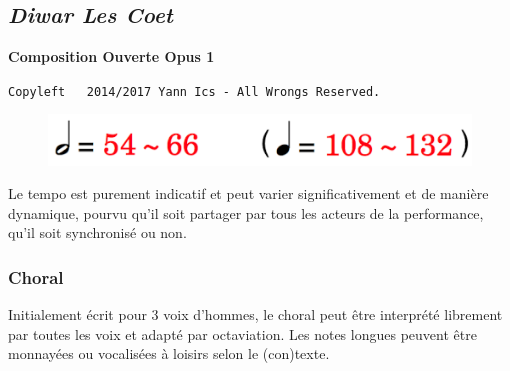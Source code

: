 
\chapter*{}

\section*{\textsl{Diwar Les Coet}}

\label{dlcscore}

\begin{center} 
\textbf{Composition Ouverte Opus 1}

{\scriptsize  \texttt{Copyleft \textcopyleft \, 2014/2017 Yann Ics - All Wrongs Reserved.}}
 \end{center} 
 \begin{figure}[H]
\includegraphics[scale=0.1]{img/dlct}
\end{figure}
 
 Le tempo est purement indicatif et peut varier significativement et de mani\`{e}re dynamique, pourvu qu'il soit partager par tous les acteurs de la performance, qu'il soit synchronis\'{e} ou non.

\subsection*{Choral}

Initialement \'{e}crit pour 3 voix d'hommes, le choral peut \^{e}tre interpr\'{e}t\'{e} librement par toutes les voix et adapt\'{e} par octaviation. Les notes longues peuvent \^{e}tre monnay\'{e}es ou vocalis\'{e}es \`{a} loisirs selon le (con)texte. 

